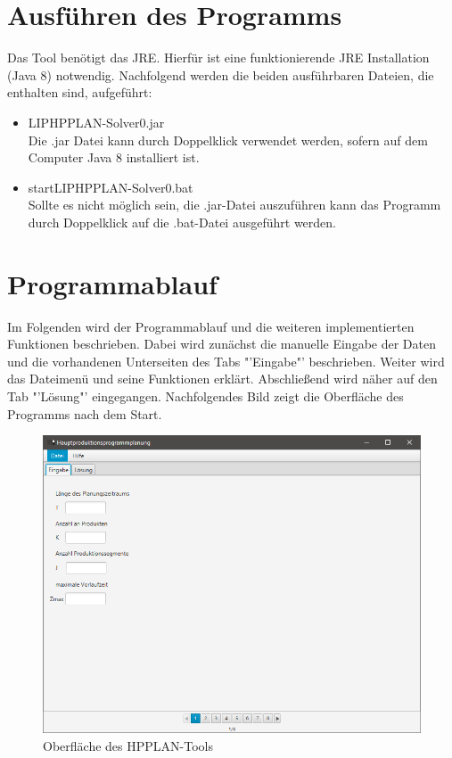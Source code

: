 \documentclass[12pt,a4paper, listof=entryprefix, bibliography=totocnumbered,toc=listofnumbered,lof=listofnumbered]{scrartcl}
\begin{document}
\section{Ausführen des Programms}
\label{ch:ausfuehren}
Das Tool benötigt das \gls{JRE}. Hierfür ist eine funktionierende \gls{JRE} Installation (Java 8) notwendig. Nachfolgend werden die beiden ausführbaren Dateien, die enthalten sind, aufgeführt:
\begin{itemize}
	\item LIP\textunderscore HPPLAN-Solver\textunderscore 0.jar\\
	Die .jar Datei kann durch Doppelklick verwendet werden, sofern auf dem Computer Java 8 installiert ist.
	\item start\textunderscore LIP\textunderscore HPPLAN-Solver\textunderscore 0.bat\\
	Sollte es nicht möglich sein, die .jar-Datei auszuführen kann das Programm durch Doppelklick auf die .bat-Datei ausgeführt werden.
\end{itemize}

\pagebreak

\section{Programmablauf}
\label{ch:programmablauf}
Im Folgenden wird der Programmablauf und die weiteren implementierten Funktionen beschrieben. Dabei wird zunächst die manuelle Eingabe der Daten und die vorhandenen Unterseiten des Tabs "'Eingabe"' beschrieben. Weiter wird das Dateimenü und seine Funktionen erklärt. Abschließend wird näher auf den Tab "'Lösung"' eingegangen. Nachfolgendes Bild zeigt die Oberfläche des Programms nach dem Start.

\begin{figure}[H]
	\centering
	\includegraphics[width=1.0\linewidth]{images/HPPLAN_GUI.png} 
	\caption{Oberfläche des HPPLAN-Tools}
	\label{fig:hpplangui}
\end{figure}
\end{document}
